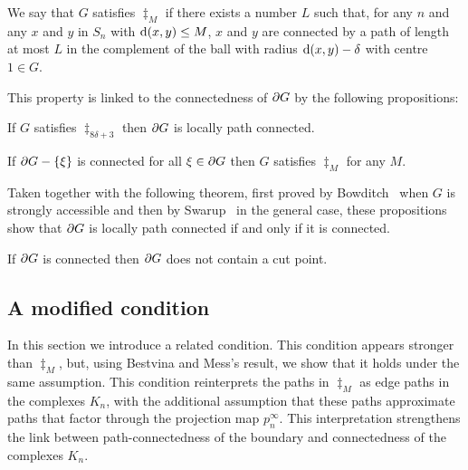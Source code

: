 \documentclass[a4paper]{article}
\begin{document}
\begin{definition}
  We say that $G$ satisfies $\ddag_M$ if there exists a number $L$ such that,
  for any $n$ and any $x$ and $y$ in $S_n$ with $\operatorname{d}(x,y) \leq M$, $x$ and
  $y$ are connected by a path of length at most $L$ in the complement of the
  ball with radius $\operatorname{d}(x,y) - \delta$ with centre $1 \in G$.
\end{definition}

This property is linked to the connectedness of $\partial G$ by the following
propositions:

\begin{proposition}\cite[Proposition 3.2]{bestvinamess91}
  If $G$ satisfies $\ddag_{8\delta + 3}$ then $\partial G$ is locally path
  connected.
\end{proposition}

\begin{proposition}\cite[Proposition 3.3]{bestvinamess91}\label{prop:BM2}
  If $\partial G - \left\{\xi\right\}$ is connected for all $\xi \in \partial G$ then
  $G$ satisfies $\ddag_M$ for any $M$.
\end{proposition}

Taken together with the following theorem, first proved by
Bowditch~\cite{bowditch98b} when $G$ is strongly accessible and then by
Swarup~\cite{swarup96} in the general case, these propositions show that
$\partial G$ is locally path connected if and only if it is connected.

\begin{theorem}\cite{bowditch98b,swarup96}
  If $\partial G$ is connected then $\partial G$ does not contain a cut
  point.
\end{theorem}

\subsection{A modified condition}

In this section we introduce a related condition. This condition appears
stronger than $\ddag_M$, but, using Bestvina and Mess's result, we show that it
holds under the same assumption. This condition reinterprets the paths in
$\ddag_M$ as edge paths in the complexes $K_n$, with the additional assumption
that these paths approximate paths that factor through the projection map
$p^\infty_n$. This interpretation strengthens the link between
path-connectedness of the boundary and connectedness of the complexes $K_n$.
\end{document}
